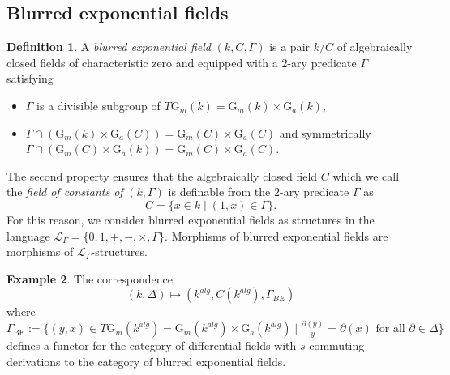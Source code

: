 \documentclass[12pt]{amsart}
\newcommand{\BE}{\mathrm{BE}}
\theoremstyle{definition}
\newtheorem{defn}{Definition}[section]
\newtheorem{exam}[defn]{Example}
\theoremstyle{plain}
\theoremstyle{exampstyle}\newtheorem{thmx}{Theorem}
\theoremstyle{exampstyle}\newtheorem{thmxbis}{Theorem}
\newcommand{\Gm}{\mathrm{G}_m}
\newcommand{\Ga}{\mathrm{G}_a}
\begin{document}
\subsection{Blurred exponential fields}  

\begin{defn}\label{definition-blurredexpfields}
A {\em blurred exponential field} $(k,C,\Gamma)$ is a pair $k/C$  of algebraically closed fields of characteristic zero  and equipped with a $2$-ary predicate $\Gamma$ satisfying  
\begin{itemize}
\item[(i)] $\Gamma$ is a divisible subgroup of $T\Gm(k) = \Gm(k) \times \Ga(k)$, 
\item[(ii)] $\Gamma \cap (\Gm(k) \times \Ga(C)) = \Gm(C) \times \Ga(C)$ and symmetrically $\Gamma \cap (\Gm(C) \times \Ga(k))  = \Gm(C) \times \Ga(C)$.
\end{itemize}
\end{defn} 
The second property ensures that the algebraically closed field $C$ which we call the {\em field of constants of } $(k,\Gamma)$ is definable from the $2$-ary predicate $\Gamma$ as 
$$ C = \lbrace x \in k \mid (1,x) \in \Gamma \rbrace.$$ 
For this reason, we consider blurred exponential fields as structures in the language $\mathcal L_\Gamma = \lbrace 0,1,+,-,\times, \Gamma \rbrace$. Morphisms of blurred exponential fields are morphisms of $\mathcal L_{\Gamma}$-structures.  


\begin{exam}\label{example-blurreddifferentialfields}  The correspondence $$(k,\Delta) \mapsto (k^{alg}, C(k^{alg}), \Gamma_{BE})$$
where $\Gamma_{\BE}:= \lbrace (y,x) \in T\Gm(k^{alg}) = \Gm(k^{alg}) \times \Ga(k^{alg}) \mid \frac{ \partial(y) } y = \partial(x) \text{ for all } \partial \in \Delta \rbrace$  
defines a functor for the category of differential fields with $s$ commuting derivations to the category of blurred exponential fields. 
\end{exam}
\end{document}
